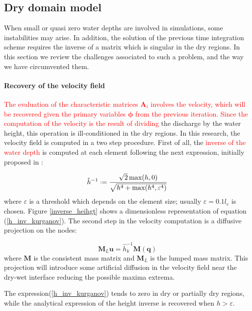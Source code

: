 \documentclass[a4paper,12pt]{elsarticle}
\newcommand{\Miguel}[1]{\textcolor{red}{#1}}
\newcommand{\defeq}{\mathrel{\vcenter{\baselineskip0.5ex\lineskiplimit0pt\hbox{\scriptsize.}\hbox{\scriptsize.}}}=}
\begin{document}
\subsection{Dry domain model}

When small or quasi zero water depths are involved in simulations, some instabilities may arise. In addition, the solution of the previous time integration scheme requires the inverse of a matrix which is singular in the dry regions. In this section we review the challenges associated to such a problem, and the way we have circumvented them.

\paragraph{Recovery of the velocity field}
\Miguel{
The evaluation of the characteristic matrices $\mathbf{A}_i$ involves the velocity, which will be recovered given the primary variables $\bm{\phi}$ from the previous iteration.
}%
\Miguel{
Since the computation of the velocity is the result of dividing
}
the discharge by the water height, this operation is ill-conditioned in the dry regions. In this research, the velocity field is computed in a two step procedure. First of all, the \Miguel{inverse of the water depth} is computed at each element following the next expression, initially proposed in \cite{kurganov2007}:

\begin{equation} \label{h_inv_kurganov}
\hat{h}^{-1} \defeq \frac{\sqrt{2}\max(h,0)}{\sqrt{h^4 + \max(h^4, \varepsilon^4)}}
\end{equation}
where $\varepsilon$ is a threshold which depends on the element size; usually $\varepsilon = 0.1 l_e$ is chosen. Figure \ref{inverse_heihgt} shows a dimensionless representation of equation (\ref{h_inv_kurganov}). The second step in the velocity computation is a diffusive projection on the nodes:

\begin{equation}
\mathbf{M}_L \mathbf{u} = \hat{h}^{-1}_k \mathbf{M} (\mathbf{q})
\end{equation}
where $\mathbf{M}$ is the consistent mass matrix and $\mathbf{M}_L$ is the lumped mass matrix. This projection will introduce some artificial diffusion in the velocity field near the dry-wet interface reducing the possible maxima extrema.

The expression(\ref{h_inv_kurganov}) tends to zero in dry or partially dry regions, while the analytical expression of the height inverse is recovered when $h>\varepsilon$.
\end{document}

